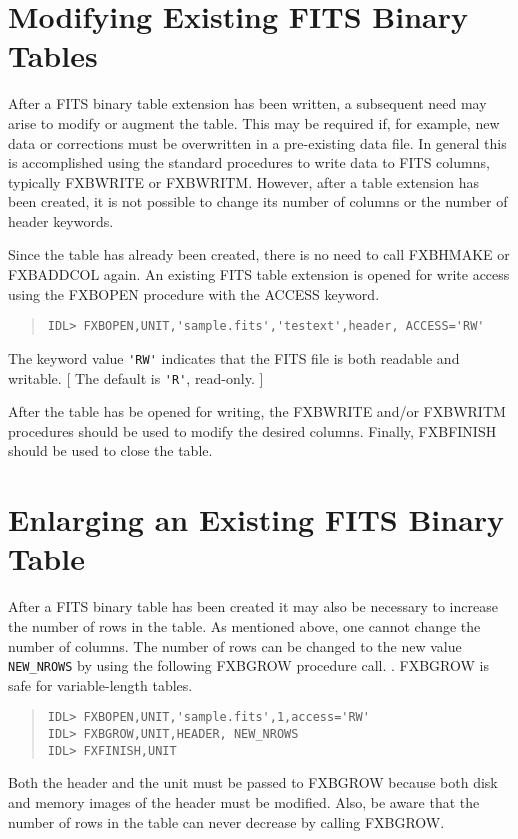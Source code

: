 \section{Modifying Existing FITS Binary Tables}

After a FITS binary table extension has been written, a subsequent
need may arise to modify or augment the table.  This may be required
if, for example, new data or corrections must be overwritten in a
pre-existing data file.  In general this is accomplished using the
standard procedures to write data to FITS columns, typically FXBWRITE
or FXBWRITM.  However, after a table extension has been created, it is
not possible to change its number of columns or the number of header
keywords.

Since the table has already been created, there is no need to call
FXBHMAKE or FXBADDCOL again.  An existing FITS table extension is
opened for write access using the FXBOPEN procedure with the ACCESS
keyword.
%
\begin{quote}
\begin{verbatim}
IDL> FXBOPEN,UNIT,'sample.fits','testext',header, ACCESS='RW'
\end{verbatim}
\end{quote}
%
The keyword value \verb|'RW'| indicates that the FITS file is both
readable and writable.  [ The default is \verb|'R'|, read-only. ]

After the table has be opened for writing, the FXBWRITE and/or
FXBWRITM procedures should be used to modify the desired columns.
Finally, FXBFINISH should be used to close the table.

\section{Enlarging an Existing FITS Binary Table}

After a FITS binary table has been created it may also be necessary to
increase the number of rows in the table.  As mentioned above, one
cannot change the number of columns.  The number of rows can be
changed to the new value \verb|NEW_NROWS| by using the following
FXBGROW procedure call.  .  FXBGROW is safe for variable-length tables.
%
\begin{quote}
\begin{verbatim}
IDL> FXBOPEN,UNIT,'sample.fits',1,access='RW'
IDL> FXBGROW,UNIT,HEADER, NEW_NROWS
IDL> FXFINISH,UNIT
\end{verbatim}
\end{quote}
%
Both the header and the unit must be passed to FXBGROW because both
disk and memory images of the header must be modified.  Also, be aware
that the number of rows in the table can never decrease by calling
FXBGROW.

